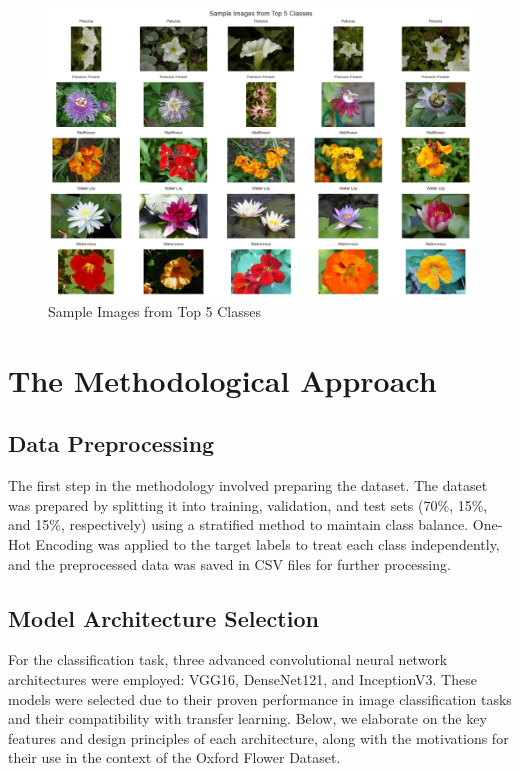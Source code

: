 \begin{figure}[h!]
    \centering
    \includegraphics[width=\linewidth]{Images/Sample Images from Top 5 Classes}
    \caption{Sample Images from Top 5 Classes}
\end{figure}


\section{The Methodological Approach}

\subsection{Data Preprocessing}

The first step in the methodology involved preparing the dataset. The dataset was prepared by splitting it into
training, validation, and test sets (70\%, 15\%, and 15\%, respectively) using a stratified method to maintain class
balance. One-Hot Encoding was applied to the target labels to
treat each class independently, and the preprocessed data was saved in CSV files for further processing.

\subsection{Model Architecture Selection}

For the classification task, three advanced convolutional neural network architectures were employed: VGG16,
DenseNet121, and InceptionV3. These models were selected due to their proven performance in image
classification tasks and their compatibility with transfer learning. Below, we elaborate on the key features and design
principles of each architecture, along with the motivations for their use in the context of the Oxford Flower Dataset.

